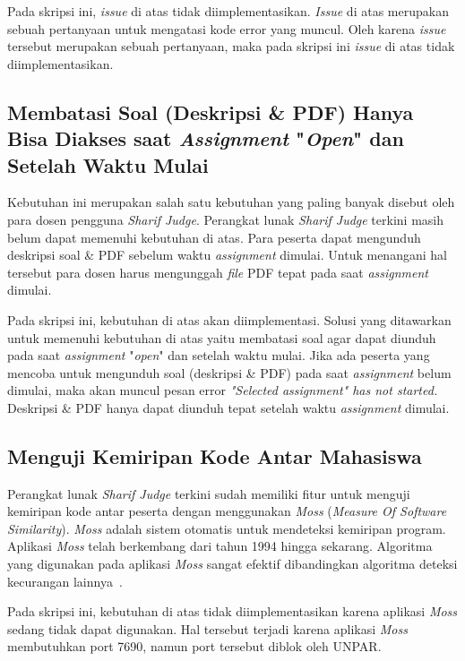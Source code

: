 Pada skripsi ini, \textit{issue} di atas tidak diimplementasikan. \textit{Issue} di atas merupakan sebuah pertanyaan untuk mengatasi kode error yang muncul. Oleh karena \textit{issue} tersebut merupakan sebuah pertanyaan, maka pada skripsi ini \textit{issue} di atas tidak diimplementasikan.

\subsection{Membatasi Soal (Deskripsi \& PDF) Hanya Bisa Diakses saat \textit{Assignment} "\textit{Open}" dan Setelah Waktu Mulai}
\label{subsec:membatasisoal}
Kebutuhan ini merupakan salah satu kebutuhan yang paling banyak disebut oleh para dosen pengguna \textit{Sharif Judge}. Perangkat lunak \textit{Sharif Judge} terkini masih belum dapat memenuhi kebutuhan di atas. Para peserta dapat mengunduh deskripsi soal \& PDF sebelum waktu \textit{assignment} dimulai. Untuk menangani hal tersebut para dosen harus mengunggah \textit{file} PDF tepat pada saat \textit{assignment} dimulai. 

Pada skripsi ini, kebutuhan di atas akan diimplementasi. Solusi yang ditawarkan untuk memenuhi kebutuhan di atas yaitu membatasi soal agar dapat diunduh pada saat \textit{assignment} "\textit{open}" dan setelah waktu mulai. Jika ada peserta yang mencoba untuk mengunduh soal (deskripsi \& PDF) pada saat \textit{assignment} belum dimulai, maka akan muncul pesan error \textit{"Selected \textit{assignment"} has not started.} Deskripsi \& PDF hanya dapat diunduh tepat setelah waktu \textit{assignment} dimulai.

\subsection{Menguji Kemiripan Kode Antar Mahasiswa}
Perangkat lunak \textit{Sharif Judge} terkini sudah memiliki fitur untuk menguji kemiripan kode antar peserta dengan menggunakan \textit{Moss} (\textit{Measure Of Software Similarity}). \textit{Moss} adalah sistem otomatis untuk mendeteksi kemiripan program. Aplikasi \textit{Moss} telah berkembang dari tahun 1994 hingga sekarang. Algoritma yang digunakan pada aplikasi \textit{Moss} sangat efektif dibandingkan algoritma deteksi kecurangan lainnya~\cite{aiken:10:moss}. 

Pada skripsi ini, kebutuhan di atas tidak diimplementasikan karena aplikasi \textit{Moss} sedang tidak dapat digunakan. Hal tersebut terjadi karena aplikasi \textit{Moss} membutuhkan port 7690, namun port tersebut diblok oleh UNPAR.

